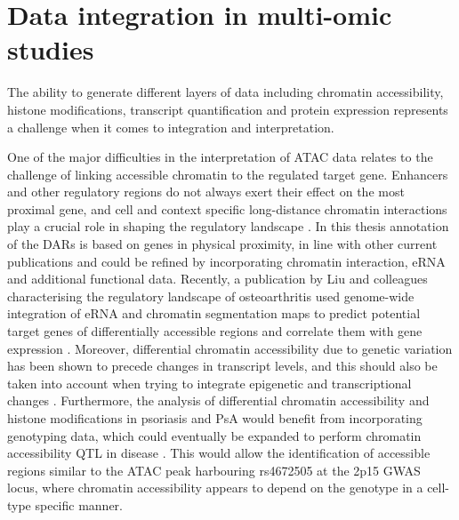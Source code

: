 \section{Data integration in multi-omic studies}
The ability to generate different layers of data including chromatin accessibility, histone modifications, transcript quantification and protein expression represents a challenge when it comes to integration and interpretation.

One of the major difficulties in the interpretation of ATAC data relates to the challenge of linking accessible chromatin to the regulated target gene. Enhancers and other regulatory regions do not always exert their effect on the most proximal gene, and cell and context specific long-distance chromatin interactions play a crucial role in shaping the regulatory landscape \parencite{Smemo2014}. In this thesis annotation of the DARs is based on genes in physical proximity, in line with other current publications \parencite{Qu2015,Scharer2016,Wang2018} and could be refined by incorporating chromatin interaction, eRNA and additional functional data. %
Recently, a publication by Liu and colleagues characterising the regulatory landscape of osteoarthritis used genome-wide integration of eRNA and chromatin segmentation maps to predict potential target genes of differentially accessible regions and correlate them with gene expression \parencite{Cao2017,Liu2018}.  Moreover, differential chromatin accessibility due to genetic variation has been shown to precede changes in transcript levels, and this should also be taken into account when trying to integrate epigenetic and transcriptional changes \parencite{Alasoo2018,Calderon2018}. Furthermore, the analysis of differential chromatin accessibility and histone modifications in psoriasis and PsA would benefit from incorporating genotyping data, which could eventually be expanded to perform chromatin accessibility QTL in disease \parencite{Mo2018,Alasoo2018}. This would allow the identification of accessible regions similar to the ATAC peak harbouring rs4672505 at the 2p15 GWAS locus, where chromatin accessibility appears to depend on the genotype in a cell-type specific manner. %


